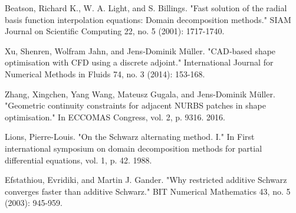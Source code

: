 \documentclass[conference]{IEEEtran}
\begin{document}
\begin{thebibliography}{00}
 Beatson, Richard K., W. A. Light, and S. Billings. "Fast solution of the radial basis function interpolation equations: Domain decomposition methods." SIAM Journal on Scientific Computing 22, no. 5 (2001): 1717-1740.

 Xu, Shenren, Wolfram Jahn, and Jens‐Dominik Müller. "CAD‐based shape optimisation with CFD using a discrete adjoint." International Journal for Numerical Methods in Fluids 74, no. 3 (2014): 153-168.

 Zhang, Xingchen, Yang Wang, Mateusz Gugala, and Jens-Dominik Müller. "Geometric continuity constraints for adjacent NURBS patches in shape optimisation." In ECCOMAS Congress, vol. 2, p. 9316. 2016.

 Lions, Pierre-Louis. "On the Schwarz alternating method. I." In First international symposium on domain decomposition methods for partial differential equations, vol. 1, p. 42. 1988.

 Efstathiou, Evridiki, and Martin J. Gander. "Why restricted additive Schwarz converges faster than additive Schwarz." BIT Numerical Mathematics 43, no. 5 (2003): 945-959.

\end{thebibliography}

\end{document}
